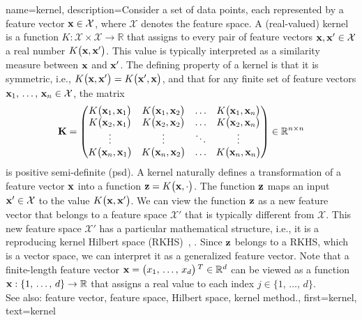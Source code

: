 {
{name={kernel}, 
	description={Consider a set of data points, each represented by a feature vector 
	 	${\bf x} \in \mathcal{X}$, where $\mathcal{X}$ denotes the feature space. 
	 	A (real-valued) kernel is a function 
	 	$K: \mathcal{X} \times \mathcal{X} \rightarrow \mathbb{R}$ that assigns to every pair of 
     		feature vectors ${\bf x}, {\bf x}' \in \mathcal{X}$ a real number $K\big({\bf x},{\bf x}'\big)$. 
     		This value is typically interpreted as a similarity measure between ${\bf x}$ and ${\bf x}'$. 
	 	The defining property of a kernel is that it is symmetric, i.e.,
	 	$K\big({\bf x},{\bf x}'\big) = K\big({\bf x}',{\bf x}\big)$, and that 
	 	for any finite set of feature vectors ${\bf x}_1, \,\ldots, \,{\bf x}_n \in \mathcal{X}$, the matrix 
	  	\begin{equation}
	 		\nonumber
	 		\mathbf{K} = \begin{pmatrix}
	 			K\big({\bf x}_1,{\bf x}_1\big) & K\big({\bf x}_1,{\bf x}_2\big) & \ldots & K\big({\bf x}_1,{\bf x}_n\big) \\
	 			K\big({\bf x}_2,{\bf x}_1\big) & K\big({\bf x}_2,{\bf x}_2\big) & \ldots & K\big({\bf x}_2,{\bf x}_n\big) \\
	 			\vdots											
	 			& \vdots & \ddots & \vdots \\
	 			K\big({\bf x}_n,{\bf x}_1\big) & K\big({\bf x}_n,{\bf x}_2\big) & \ldots & K\big({\bf x}_n,{\bf x}_n\big) 
	 		\end{pmatrix} \in \mathbb{R}^{n \times n}
	 	\end{equation}
	 	is positive semi-definite (psd). 
     		A kernel naturally defines a transformation of a feature vector ${\bf x}$ into a 
	 	function ${\bf z} = K\big({\bf x},\cdot\big)$. The function ${\bf z}$ maps an  
	 	input ${\bf x}' \in \mathcal{X}$ to the value $K\big({\bf x},{\bf x}'\big)$. 
	 	We can view the function ${\bf z}$ as a new feature vector that belongs to a 
	 	feature space $\mathcal{X}'$ that is typically different from $\mathcal{X}$. 
	 	This new feature space $\mathcal{X}'$ has a particular mathematical structure, i.e., it is a 
	 	reproducing kernel Hilbert space (RKHS)~\cite{LearningKernelsBook}, \cite{LampertNowKernel}.
     		Since ${\bf z}$ belongs to a RKHS, which is a vector space, we can interpret it as a generalized 
	 	feature vector. Note that a finite-length feature vector ${\bf x}=\big(x_{1}, \,\ldots, \,x_{d} \big)\,^{T} \in \mathbb{R}^{d}$ 
	 	can be viewed as a function ${\bf x}: \{1, \,\ldots, \,d\} \rightarrow \mathbb{R}$ 
	 	that assigns a real value to each index $j \in \{1, \,\ldots, \,d\}$.
          		\\
		See also: feature vector, feature space, Hilbert space, kernel method.},
	first={kernel},
	text={kernel} 
}
	
}
